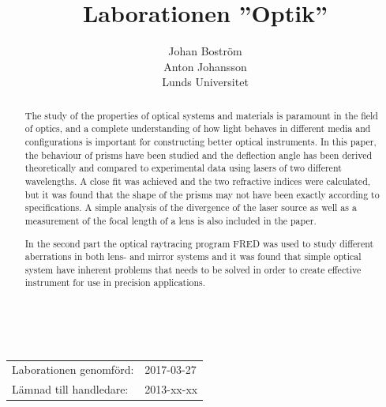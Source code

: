 \documentclass[a4paper]{article}
\title{Laborationen ”Optik”}
\author{Johan Boström\\Anton Johansson\\Lunds Universitet}
\makeatletter
\renewcommand*\maketitle{
  {
    \begin{center}
      {\huge\bfseries \@title}\\
      \vspace{5mm}
      {\large \@author}
    \end{center}
    \vspace{2mm}
  }
}
\makeatother
\begin{document}
\maketitle

\renewcommand{\abstractname}{Abstract} %

\begin{abstract}
  
  The study of the properties of optical systems and materials is paramount in the field of optics, and a complete understanding of how light behaves in different media and configurations is important for constructing better optical instruments. In this paper, the behaviour of prisms have been studied and the deflection angle has been derived theoretically and compared to experimental data using lasers of two different wavelengths. A close fit was achieved and the two refractive indices were calculated, but it was found that the shape of the prisms may not have been exactly according to specifications. A simple analysis of the divergence of the laser source as well as a measurement of the focal length of a lens is also included in the paper.
  
  In the second part the optical raytracing program FRED was used to study different aberrations in both lens- and mirror systems and it was found that simple optical system have inherent problems that needs to be solved in order to create effective instrument for use in precision applications.
  
\end{abstract}

\vspace{2mm}

\hspace{-3mm}
\begin{tabular}{ll}
Laborationen genomförd: &	2017-03-27 \\
Lämnad till handledare: &	2013-xx-xx \\
\end{tabular}
\end{document}
